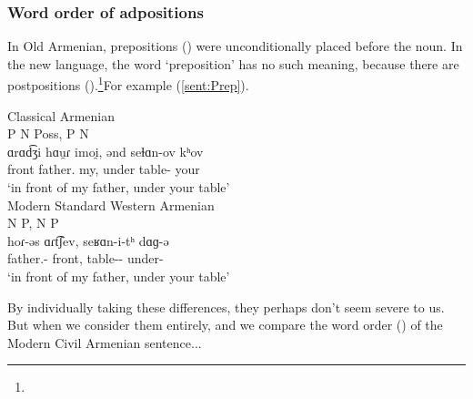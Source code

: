 \subsubsection{Word order of adpositions}

In Old Armenian, prepositions () were unconditionally placed before the noun. In the new language, the word `preposition' has no such meaning, because there are postpositions ().\footnote{}For example (\ref{sent:Prep}). 


\begin{exe}
	
	\ex \label{sent:Prep}  \begin{xlist}
		
		\ex Classical Armenian \\ \glll P N Poss, P N ~ \\ 
		ɑrɑd͡ʒi hɑu̯ɾ imoi̯, ənd seɫɑn-ov kʰov \\ 
		front father.{\gen} my, under table-{\ins} your \\
		\trans `in front of my father, under your table' \\ 
		\ex Modern Standard Western Armenian \\ \glll N P, N P \\
		hoɾ-əs ɑɾt͡ʃev, seʁɑn-i-tʰ dɑɡ-ə \\ 
		father.{\gen}-{\possFsg} front, table-{\gen}-{\possSsg} under-{} \\
		\trans `in front of my father, under your table' \\ 
	\end{xlist}
\end{exe} 



By individually taking these differences, they perhaps don't seem severe to us. But when we consider them entirely, and we compare the word order () of the Modern Civil Armenian sentence... 



\begin{adjarianpage}\label{page:24}\end{adjarianpage}%

